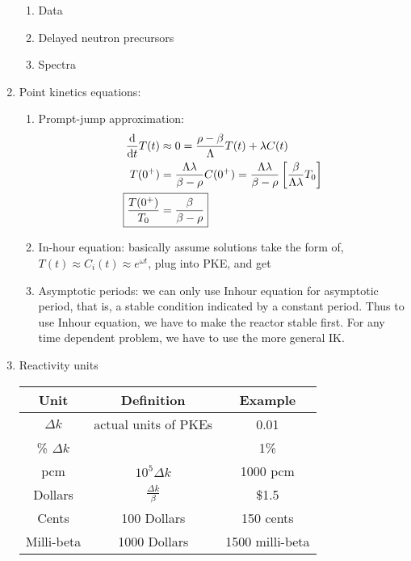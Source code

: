 \documentclass{school-22.211-notes}
\begin{document}
\begin{enumerate}
\begin{enumerate}
    \item Data
    \item Delayed neutron precursors
    \item Spectra
  \end{enumerate}

\item Point kinetics equations: 
  \begin{enumerate}
    \item Prompt-jump approximation: 
      \begin{align}
        \ddt T(t) &\approx 0 = \frac{\rho - \beta}{\Lambda} T(t) + \lambda C(t) \\
        T(0^+) &= \frac{\Lambda \lambda}{\beta - \rho} C(0^+) = \frac{\Lambda \lambda}{\beta - \rho} \left[ \frac{\beta}{\Lambda \lambda} T_0 \right] \\
        \Aboxed{ \frac{T(0^+)}{T_0} &= \frac{\beta}{\beta - \rho} }
      \end{align}
    \item In-hour equation: basically assume solutions take the form of, $T(t) \approx C_i (t) \approx e^{\omega t}$, plug into PKE, and get

    \item Asymptotic periods: we can only use Inhour equation for asymptotic period, that is, a stable condition indicated by a constant period. Thus to use Inhour equation, we have to make the reactor stable first. For any time dependent problem, we have to use the more general IK. 
  \end{enumerate}

\item Reactivity units
\begin{table}[ht]
  \centering
  \begin{tabular}{|c|c|c|} \hline
    Unit & Definition & Example \\ \hline
    $\Delta k$ & actual units of PKEs & 0.01 \\
    \% $\Delta k$ & & 1\% \\
    pcm & $10^5 \Delta k $ & 1000 pcm \\ \hline
    Dollars & $\frac{\Delta k}{\beta}$ & \$1.5 \\
    Cents & 100 Dollars & 150 cents \\ 
    Milli-beta & 1000 Dollars & 1500 milli-beta \\ \hline
  \end{tabular}
\end{table}


\end{enumerate}
\end{document}
